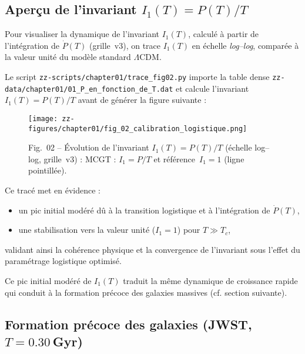 \subsection{Aperçu de l’invariant \(I_{1}(T)=P(T)/T\)}

Pour visualiser la dynamique de l’invariant \(I_{1}(T)\), calculé à partir de l’intégration de \(\dot P(T)\) (grille~v3), on trace \(I_{1}(T)\) en échelle \emph{log–log}, comparée à la valeur unité du modèle standard \(\Lambda\mathrm{CDM}\).  

Le script \texttt{zz-scripts/chapter01/trace\_fig02.py} importe la table dense  
\texttt{zz-data/chapter01/01\_P\_en\_fonction\_de\_T.dat} et calcule  
l’invariant \(I_{1}(T)=P(T)/T\) avant de générer la figure suivante :  

\begin{figure}[htbp]
  \centering
  \texttt{[image: zz-figures/chapter01/fig\_02\_calibration\_logistique.png]}
  \caption{Fig.~02 – Évolution de l’invariant \(I_{1}(T)=P(T)/T\) (échelle log–log, grille~v3) :  
           MCGT : \(I_{1}=P/T\) et référence \(\,I_{1}=1\) (ligne pointillée).}
  \label{fig:ratio_PT_log}
\end{figure}

Ce tracé met en évidence :
\begin{itemize}
  \item un pic initial modéré dû à la transition logistique et à l’intégration de \(\dot P(T)\),  
  \item une stabilisation vers la valeur unité (\(I_{1}=1\)) pour \(T\gg T_{c}\),
\end{itemize}
validant ainsi la cohérence physique et la convergence de l’invariant sous l’effet du paramétrage logistique optimisé.

Ce pic initial modéré de \(I_{1}(T)\) traduit la même dynamique de croissance rapide  
qui conduit à la formation précoce des galaxies massives (cf. section suivante).

\subsection{Formation précoce des galaxies (JWST, \(T=0.30\) Gyr)}

